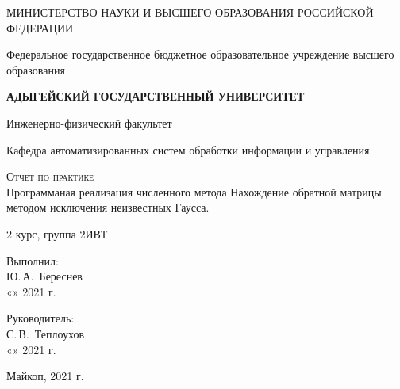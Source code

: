 \documentclass[12pt,a4paper]{scrartcl}
\begin{document}
	\begin{titlepage}
		\begin{center}
			\large
			МИНИСТЕРСТВО НАУКИ И ВЫСШЕГО ОБРАЗОВАНИЯ РОССИЙСКОЙ ФЕДЕРАЦИИ
			
			Федеральное государственное бюджетное образовательное учреждение высшего образования
			
			\textbf{АДЫГЕЙСКИЙ ГОСУДАРСТВЕННЫЙ УНИВЕРСИТЕТ}
			\vspace{0.25cm}
			
			Инженерно-физический факультет
			
			Кафедра автоматизированных систем обработки информации и управления
			\vfill

			\vfill
			
			\textsc{Отчет по практике}\\[5mm]
			
			{\LARGE Программаная реализация численного метода \LARGE{ Нахождение обратной матрицы методом исключения неизвестных Гаусса.}}
			\bigskip
			
			2 курс, группа 2ИВТ
		\end{center}
		\vfill
		
		\newlength{\ML}
		\hfill\begin{minipage}{0.5\textwidth}
			Выполнил:\\
			\underline{\hspace{\ML}} Ю.\,А.~Береснев\\
			«\underline{\hspace{0.7cm}}» \underline{\hspace{2cm}} 2021 г.
		\end{minipage}%
		\bigskip
		
		\hfill\begin{minipage}{0.5\textwidth}
			Руководитель:\\
			\underline{\hspace{\ML}} С.\,В.~Теплоухов\\
			«\underline{\hspace{0.7cm}}» \underline{\hspace{2cm}} 2021 г.
		\end{minipage}%
		\vfill
		
		\begin{center}
			Майкоп, 2021 г.
		\end{center}
	\end{titlepage}
	
\end{document}
